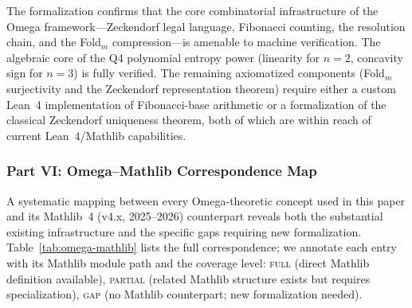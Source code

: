\noindent
The formalization confirms that the core combinatorial infrastructure
of the Omega framework---Zeckendorf legal language, Fibonacci counting,
the resolution chain, and the Fold$_m$ compression---is amenable to
machine verification.  The algebraic core of the Q4 polynomial entropy
power (linearity for $n=2$, concavity sign for $n=3$) is fully
verified.  The remaining axiomatized components (Fold$_m$ surjectivity
and the Zeckendorf representation theorem) require either a custom
Lean~4 implementation of Fibonacci-base arithmetic or a formalization
of the classical Zeckendorf uniqueness theorem, both of which are
within reach of current Lean~4/Mathlib capabilities.


\subsubsection*{Part VI: Omega--Mathlib Correspondence Map}

A systematic mapping between every Omega-theoretic concept used in
this paper and its Mathlib~4 (v4.x, 2025--2026) counterpart reveals
both the substantial existing infrastructure and the specific gaps
requiring new formalization.
Table~\ref{tab:omega-mathlib} lists the full correspondence;
we annotate each entry with its Mathlib module path and the
coverage level:
\textsc{full} (direct Mathlib definition available),
\textsc{partial} (related Mathlib structure exists but requires
specialization),
\textsc{gap} (no Mathlib counterpart; new formalization needed).

